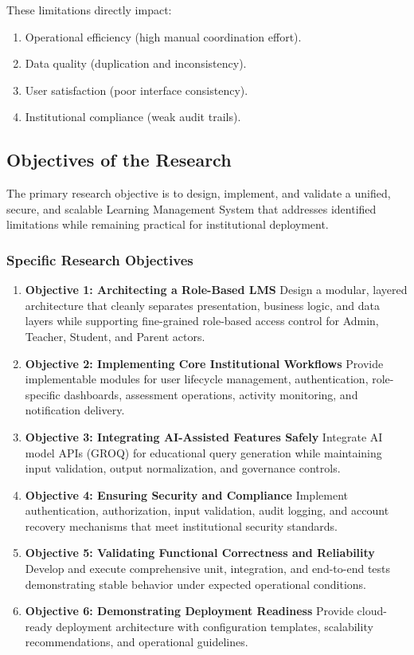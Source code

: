 \documentclass[11pt,a4paper]{article}
\begin{document}
These limitations directly impact:

\begin{enumerate}
    \item Operational efficiency (high manual coordination effort).
    \item Data quality (duplication and inconsistency).
    \item User satisfaction (poor interface consistency).
    \item Institutional compliance (weak audit trails).
\end{enumerate}

\subsection{Objectives of the Research}

The primary research objective is to design, implement, and validate a unified, secure, and scalable Learning Management System that addresses identified limitations while remaining practical for institutional deployment.

\subsubsection{Specific Research Objectives}

\begin{enumerate}
    \item \textbf{Objective 1: Architecting a Role-Based LMS} Design a modular, layered architecture that cleanly separates presentation, business logic, and data layers while supporting fine-grained role-based access control for Admin, Teacher, Student, and Parent actors.

    \item \textbf{Objective 2: Implementing Core Institutional Workflows} Provide implementable modules for user lifecycle management, authentication, role-specific dashboards, assessment operations, activity monitoring, and notification delivery.

    \item \textbf{Objective 3: Integrating AI-Assisted Features Safely} Integrate AI model APIs (GROQ) for educational query generation while maintaining input validation, output normalization, and governance controls.

    \item \textbf{Objective 4: Ensuring Security and Compliance} Implement authentication, authorization, input validation, audit logging, and account recovery mechanisms that meet institutional security standards.

    \item \textbf{Objective 5: Validating Functional Correctness and Reliability} Develop and execute comprehensive unit, integration, and end-to-end tests demonstrating stable behavior under expected operational conditions.

    \item \textbf{Objective 6: Demonstrating Deployment Readiness} Provide cloud-ready deployment architecture with configuration templates, scalability recommendations, and operational guidelines.
\end{enumerate}
\end{document}
